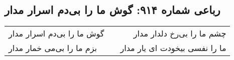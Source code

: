 \begin{center}
\section*{رباعی شماره ۹۱۴: گوش ما را بی‌دم اسرار مدار}
\label{sec:0914}
\begin{longtable}{l p{0.5cm} r}
گوش ما را بی‌دم اسرار مدار
&&
چشم ما را بی‌رخ دلدار مدار
\\
بزم ما را بی‌می خمار مدار
&&
ما را نفسی بیخودت ای یار مدار
\\
\end{longtable}
\end{center}
